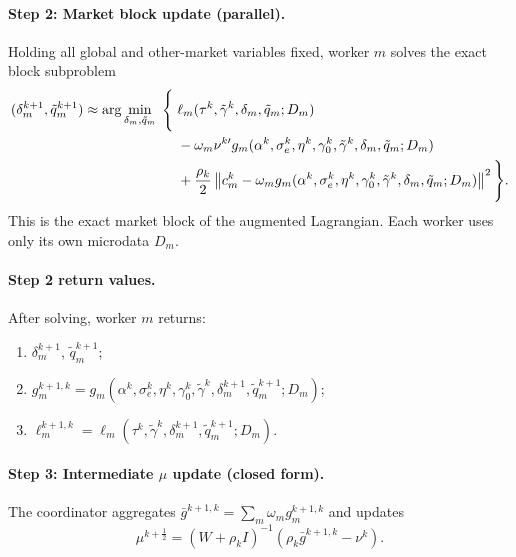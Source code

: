 \documentclass[11pt]{article}
\begin{document}
\paragraph{Step 2: Market block update (parallel).} Holding all global and other-market variables fixed, worker $m$ solves the exact block subproblem
\begin{align}
(\delta_m^{k+1},\tilde q_m^{k+1}) \approx \arg\min_{\delta_m,\tilde q_m}\;\Bigg\{
&\;\ell_m(\tau^k,\tilde\gamma^k,\delta_m,\tilde q_m;D_m) \notag\\
&\;-\omega_m\nu^{k\prime} g_m(\alpha^k,\sigma_e^k,\eta^k,\gamma_0^k,\tilde\gamma^k,\delta_m,\tilde q_m;D_m) \notag\\
&\;+ \frac{\rho_k}{2}\left\|c_m^k - \omega_m g_m(\alpha^k,\sigma_e^k,\eta^k,\gamma_0^k,\tilde\gamma^k,\delta_m,\tilde q_m;D_m)\right\|^2
\Bigg\}.
\label{eq:market_subproblem}
\end{align}
This is the exact market block of the augmented Lagrangian. Each worker uses only its own microdata $D_m$.

\paragraph{Step 2 return values.} After solving, worker $m$ returns:
\begin{enumerate}[label=(\roman*)]
\item $\delta_m^{k+1}$, $\tilde q_m^{k+1}$;
\item $g_m^{k+1,k} = g_m(\alpha^k,\sigma_e^k,\eta^k,\gamma_0^k,\tilde\gamma^k,\delta_m^{k+1},\tilde q_m^{k+1};D_m)$;
\item $\ell_m^{k+1,k} = \ell_m(\tau^k,\tilde\gamma^k,\delta_m^{k+1},\tilde q_m^{k+1};D_m)$.
\end{enumerate}

\paragraph{Step 3: Intermediate $\mu$ update (closed form).} The coordinator aggregates $\bar g^{k+1,k} = \sum_m \omega_m g_m^{k+1,k}$ and updates
\begin{equation}\label{eq:mu_mid}
\mu^{k+\frac{1}{2}} = (W+\rho_k I)^{-1}(\rho_k \bar g^{k+1,k} - \nu^k).
\end{equation}
\end{document}
